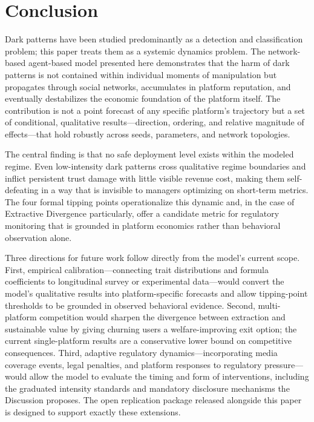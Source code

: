 \documentclass[a4paper,fleqn]{cas-sc}
\begin{document}
\section{Conclusion}
Dark patterns have been studied predominantly as a detection and classification problem; this paper treats them as a systemic dynamics problem. The network-based agent-based model presented here demonstrates that the harm of dark patterns is not contained within individual moments of manipulation but propagates through social networks, accumulates in platform reputation, and eventually destabilizes the economic foundation of the platform itself. The contribution is not a point forecast of any specific platform's trajectory but a set of conditional, qualitative results---direction, ordering, and relative magnitude of effects---that hold robustly across seeds, parameters, and network topologies.

The central finding is that no safe deployment level exists within the modeled regime. Even low-intensity dark patterns cross qualitative regime boundaries and inflict persistent trust damage with little visible revenue cost, making them self-defeating in a way that is invisible to managers optimizing on short-term metrics. The four formal tipping points operationalize this dynamic and, in the case of Extractive Divergence particularly, offer a candidate metric for regulatory monitoring that is grounded in platform economics rather than behavioral observation alone.

Three directions for future work follow directly from the model's current scope. First, empirical calibration---connecting trait distributions and formula coefficients to longitudinal survey or experimental data---would convert the model's qualitative results into platform-specific forecasts and allow tipping-point thresholds to be grounded in observed behavioral evidence. Second, multi-platform competition would sharpen the divergence between extraction and sustainable value by giving churning users a welfare-improving exit option; the current single-platform results are a conservative lower bound on competitive consequences. Third, adaptive regulatory dynamics---incorporating media coverage events, legal penalties, and platform responses to regulatory pressure---would allow the model to evaluate the timing and form of interventions, including the graduated intensity standards and mandatory disclosure mechanisms the Discussion proposes. The open replication package released alongside this paper is designed to support exactly these extensions.
\end{document}
